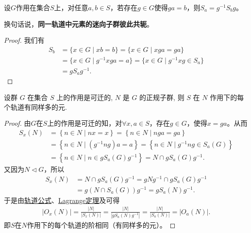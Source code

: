 \documentclass[../../main.tex]{subfiles}%
\begin{document}
\begin{proposition}
设$G$作用在集合$S$上，对任意$a,b\in S$，若存在$g\in G$使得$ga=b$，则$S_a=g^{-1}S_bg$。
\end{proposition}
\begin{remark}
换句话说，\textbf{同一轨道中元素的迷向子群彼此共轭}。
\end{remark}
\begin{proof}
我们有
\begin{align*}
S_b &= \{x\in G \mid xb = b\} = \{x\in G \mid xga = ga\} \\
&= \{x\in G \mid g^{-1}xga = a\} = \{x\in G \mid g^{-1}xg \in S_a\} \\
&= gS_ag^{-1}.
\end{align*}
\end{proof}

\begin{example}
设群 $G$ 在集合 $S$ 上的作用是可迁的, $N$ 是 $G$ 的正规子群, 则 $S$ 在 $N$ 作用下的每个轨道有同样多的元.
\end{example}
\begin{proof}
由$G$在$S$上的作用是可迁的知，对$\forall x,a\in S$，存在$g\in G$，使得$x=ga$。从而
\begin{align*}
S_x\left( N \right) &=\left\{ n\in N\mid nx=x \right\} =\left\{ n\in N\mid nga=ga \right\} \\
&=\left\{ n\in N\mid \left( g^{-1}ng \right) a=a \right\} =\left\{ n\in N\mid g^{-1}ng\in S_a\left( G \right) \right\} \\
&=\left\{ n\in N\mid n\in gS_a\left( G \right) g^{-1} \right\} =N\cap gS_a\left( G \right) g^{-1}.
\end{align*}
又因为$N\lhd G$，所以
\begin{align*}
S_x\left( N \right) &=N\cap gS_a\left( G \right) g^{-1}=gNg^{-1}\cap gS_a\left( G \right) g^{-1}\\
&=g\left( N\cap S_a\left( G \right) \right) g^{-1}=gS_a\left( N \right) g^{-1}.
\end{align*}
于是由\hyperref[corollary:有限群轨道的阶与其商掉迷向子群的阶相同]{轨道公式}、\hyperref[theorem:抽象代数--Lagrange定理]{Lagrange定理}及可得
\begin{align*}
\left| O_x\left( N \right) \right|=\frac{\left| N \right|}{\left| S_x\left( N \right) \right|}=\frac{\left| N \right|}{\left| gS_a\left( N \right) g^{-1} \right|}=\frac{\left| N \right|}{\left| S_a\left( N \right) \right|}=\left| O_a\left( N \right) \right|.
\end{align*}
即$S$在$N$作用下的每个轨道的阶相同（有同样多的元）。
\end{proof}
\end{document}
